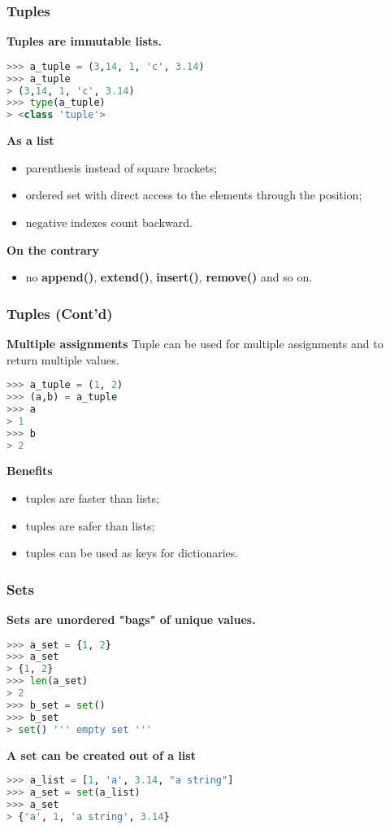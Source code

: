\subsubsection{Tuples}
\textbf{Tuples are immutable lists.}
\begin{lstlisting}[language=Python]
>>> a_tuple = (3,14, 1, 'c', 3.14)
>>> a_tuple
> (3,14, 1, 'c', 3.14)
>>> type(a_tuple)
> <class 'tuple'>
\end{lstlisting}
\textbf{As a list}
\begin{itemize}
	\item parenthesis instead of square brackets;
	\item ordered set with direct access to the elements through the position;
	\item negative indexes count backward.
\end{itemize}
\textbf{On the contrary}
\begin{itemize}
	\item no \textbf{append()}, \textbf{extend()}, \textbf{insert()}, \textbf{remove()} and so on.
\end{itemize}

\subsubsection{Tuples (Cont'd)}
\textbf{Multiple assignments}
Tuple can be used for multiple assignments and to return multiple values.
\begin{lstlisting}[language=Python]
>>> a_tuple = (1, 2)
>>> (a,b) = a_tuple
>>> a
> 1
>>> b
> 2
\end{lstlisting}
\textbf{Benefits}
\begin{itemize}
	\item tuples are faster than lists;
	\item tuples are safer than lists;
	\item tuples can be used as keys for dictionaries.
\end{itemize}

\subsubsection{Sets}
\textbf{Sets are unordered "bags" of unique values.}
\begin{lstlisting}[language=Python]
>>> a_set = {1, 2}
>>> a_set
> {1, 2}
>>> len(a_set)
> 2
>>> b_set = set()
>>> b_set
> set() ''' empty set '''
\end{lstlisting}
\textbf{A set can be created out of a list}
\begin{lstlisting}[language=Python]
>>> a_list = [1, 'a', 3.14, "a string"]
>>> a_set = set(a_list)
>>> a_set
> {'a', 1, 'a string', 3.14}
\end{lstlisting}

